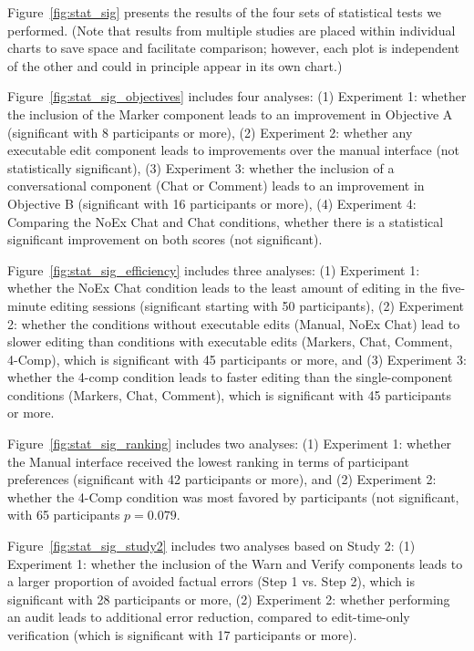 \documentclass[manuscript]{acmart}
\begin{document}
Figure~\ref{fig:stat_sig} presents the results of the four sets of statistical tests we performed.  (Note that results from multiple studies are placed within individual charts to save space and facilitate comparison; however, each plot is independent of the other and could in principle appear in its own chart.)

Figure~\ref{fig:stat_sig_objectives} includes four analyses: (1) Experiment 1: whether the inclusion of the Marker component leads to an improvement in Objective A (significant with 8 participants or more), (2) Experiment 2: whether any executable edit component leads to improvements over the manual interface (not statistically significant), (3) Experiment 3: whether the inclusion of a conversational component (Chat or Comment) leads to an improvement in Objective B (significant with 16 participants or more), (4) Experiment 4: Comparing the NoEx Chat and Chat conditions, whether there is a statistical significant improvement on both scores (not significant).

Figure~\ref{fig:stat_sig_efficiency} includes three analyses: (1) Experiment 1: whether the NoEx Chat condition leads to the least amount of editing in the five-minute editing sessions (significant starting with 50 participants), (2) Experiment 2: whether the conditions without executable edits (Manual, NoEx Chat) lead to slower editing than conditions with executable edits (Markers, Chat, Comment, 4-Comp), which is significant with 45 participants or more, and (3) Experiment 3: whether the 4-comp condition leads to faster editing than the single-component conditions (Markers, Chat, Comment), which is significant with 45 participants or more.

Figure~\ref{fig:stat_sig_ranking} includes two analyses: (1) Experiment 1: whether the Manual interface received the lowest ranking in terms of participant preferences (significant with 42 participants or more), and (2) Experiment 2: whether the 4-Comp condition was most favored by participants (not significant, with 65 participants $p=0.079$.

Figure~\ref{fig:stat_sig_study2} includes two analyses based on Study 2: (1) Experiment 1: whether the inclusion of the Warn and Verify components leads to a larger proportion of avoided factual errors (Step 1 vs. Step 2), which is significant with 28 participants or more, (2) Experiment 2:  whether performing an audit leads to additional error reduction, compared to edit-time-only verification (which is significant with 17 participants or more).
\end{document}
